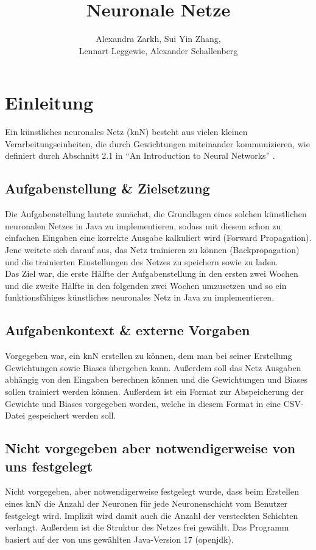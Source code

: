 \documentclass[paper=A4,pagesize=auto,12pt,headinclude=true,footinclude=true,BCOR=0mm,DIV=calc]{scrartcl}
\title{Neuronale Netze}
\author{Alexandra Zarkh, Sui Yin Zhang,\\ Lennart Leggewie, Alexander Schallenberg}
\begin{document}
\begin{titlepage}
	\maketitle
\end{titlepage}

\tableofcontents
\newpage



\section{Einleitung}
Ein künstliches neuronales Netz (knN) besteht aus vielen kleinen Verarbeitungseinheiten, die durch Gewichtungen miteinander kommunizieren, wie definiert durch Abschnitt 2.1 in “An Introduction to Neural Networks” \cite{script}.

\subsection{Aufgabenstellung \& Zielsetzung}
Die Aufgabenstellung lautete zunächst, die Grundlagen eines solchen künstlichen neuronalen Netzes in Java zu implementieren, sodass mit diesem schon zu einfachen Eingaben eine korrekte Ausgabe kalkuliert wird (Forward Propagation). Jene weitete sich darauf aus, das Netz trainieren zu können (Backpropagation) und die trainierten Einstellungen des Netzes zu speichern sowie zu laden.\\
Das Ziel war, die erste Hälfte der Aufgabenstellung in den ersten zwei Wochen und die zweite Hälfte in den folgenden zwei Wochen umzusetzen und so ein funktionsfähiges künstliches neuronales Netz in Java zu implementieren.

\subsection{Aufgabenkontext \& externe Vorgaben}
Vorgegeben war, ein knN erstellen zu können, dem man bei seiner Erstellung Gewichtungen sowie Biases übergeben kann. Außerdem soll das Netz Ausgaben abhängig von den Eingaben berechnen können und die Gewichtungen und Biases sollen trainiert werden können. Außerdem ist ein Format zur Abspeicherung der Gewichte und Biases vorgegeben worden, welche in diesem Format in eine CSV-Datei gespeichert werden soll.

\subsection{Nicht vorgegeben aber notwendigerweise von uns festgelegt}
Nicht vorgegeben, aber notwendigerweise festgelegt wurde, dass beim Erstellen eines knN die Anzahl der Neuronen für jede Neuronenschicht vom Benutzer festgelegt wird. Implizit wird damit auch die Anzahl der versteckten Schichten verlangt. Außerdem ist die Struktur des Netzes frei gewählt. Das Programm basiert auf der von uns gewählten Java-Version 17 (openjdk).
\end{document}
